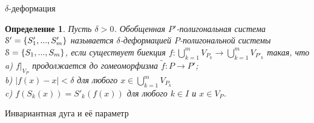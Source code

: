 \documentclass[aspectratio=1610, 10pt, notheorems]{beamer}
\newtheorem{theorem}     {Теорема}
\newtheorem{definition}  {Определение}
\newtheorem{remark}      {Замечание}
\begin{document}




\begin{frame}{$\delta$-деформация}
\begin{definition}
Пусть $\delta>0$. 
Обобщенная $P'$-полигональная система ${\EuScript S}'=\{S'_1,...,S'_m\}$ называется $\delta$-деформацией $P$-полигональной системы ${\EuScript S}=\{S_1,...,S_m\}$, если существует биекция $f:\bigcup\limits_{k=1}^m V_{P_k}\to \bigcup\limits_{k=1}^m V_{P'_k}$ такая, что\\
a) $f|_{V_P}$ продолжается до гомеоморфизма $\tilde f: P\to  P'$; \\ 
b) $|f(x)-x|<\delta$  для любого $x\in \bigcup\limits_{k=1}^m V_{P_k}$\\  
c) $f(S_k(x))=S'_k(f(x))$ для любого $k\in I$ и $x\in V_P$.
\end{definition}
\end{frame}


\begin{frame}{Инвариантная дуга и её параметр}

\end{frame}
\end{document}
